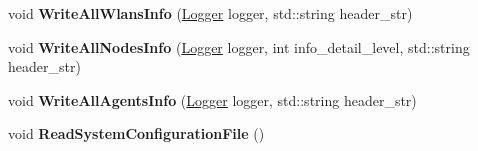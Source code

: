 \begin{DoxyCompactItemize}
void {\bfseries Write\+All\+Wlans\+Info} (\hyperlink{structLogger}{Logger} logger, std\+::string header\+\_\+str)
\item 
\mbox{\label{classcompcxx__Komondor__27_a36591aff6be24f546405c5f5b98c3762}} 
void {\bfseries Write\+All\+Nodes\+Info} (\hyperlink{structLogger}{Logger} logger, int info\+\_\+detail\+\_\+level, std\+::string header\+\_\+str)
\item 
\mbox{\label{classcompcxx__Komondor__27_a693426c10b883f79d295980b9de2d160}} 
void {\bfseries Write\+All\+Agents\+Info} (\hyperlink{structLogger}{Logger} logger, std\+::string header\+\_\+str)
\item 
\mbox{\label{classcompcxx__Komondor__27_ac523ba46f25c317b3931fde7dfd5f0fa}} 
void {\bfseries Read\+System\+Configuration\+File} ()
\end{DoxyCompactItemize}
